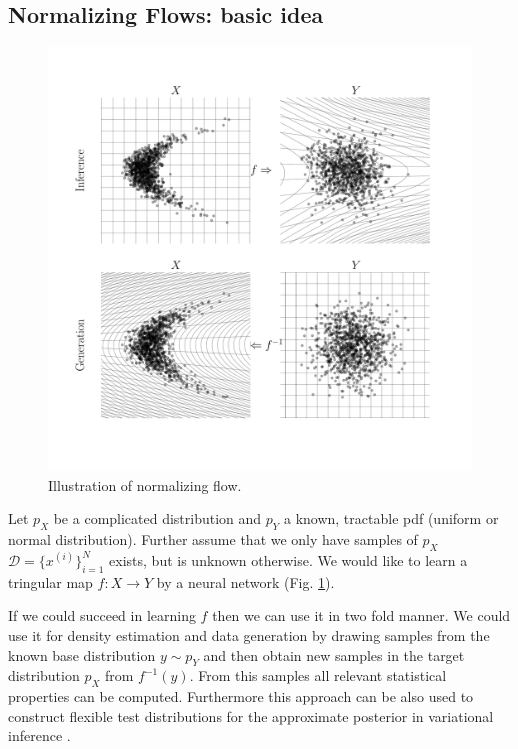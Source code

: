 \documentclass[12pt,a4paper]{article}
\begin{document}


\subsection{Normalizing Flows: basic idea}
\begin{figure}[h!]
	\includegraphics[width=\linewidth]{normalizing_flow_img.pdf}
	\caption{Illustration of normalizing flow.}
	\label{fig:normalizing_flow}
\end{figure}
Let $p_X$ be a complicated distribution and $p_Y$ a known, tractable pdf (uniform or normal distribution). Further assume that we only have samples of $p_X$ $\mathcal D = \{x^{(i)}\}_{i=1}^N$ exists, but is unknown otherwise. We would like to learn a tringular map $f: X\rightarrow Y$ by a neural network  (Fig. \ref{fig:normalizing_flow}).

If we could succeed in learning $f$ then we can use it in two fold manner. We could use it for density estimation and data generation by drawing samples from the known base distribution $y \sim p_Y$ and then obtain new samples in the target distribution $p_X$ from $f^{-1}(y)$. From this samples all relevant statistical properties can be computed.
 Furthermore this approach can be also used to construct flexible test distributions for the approximate posterior in variational inference \cite{rezende_2015}.
\end{document}
